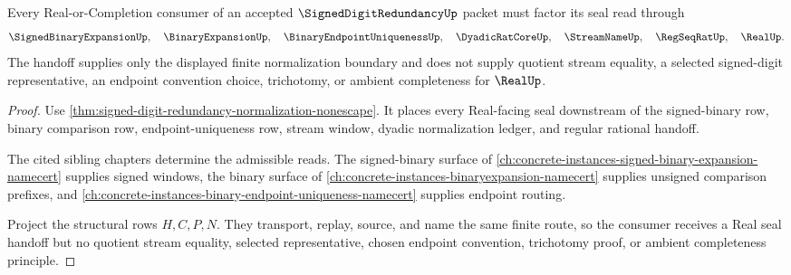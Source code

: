 \begin{theorem}
\label{thm:signed-digit-redundancy-real-seal-handoff}
Every Real-or-Completion consumer of an accepted $\SignedDigitRedundancyUp$ packet must factor its seal read through
$$
\SignedBinaryExpansionUp,\quad \BinaryExpansionUp,\quad \BinaryEndpointUniquenessUp,\quad \DyadicRatCoreUp,\quad \StreamNameUp,\quad \RegSeqRatUp,\quad \RealUp .
$$
The handoff supplies only the displayed finite normalization boundary and does not supply quotient stream equality, a selected signed-digit representative, an endpoint convention choice, trichotomy, or ambient completeness for $\RealUp$.
\end{theorem}
\begin{proof}
Use \autoref{thm:signed-digit-redundancy-normalization-nonescape}. It places every Real-facing seal downstream of the signed-binary row, binary comparison row, endpoint-uniqueness row, stream window, dyadic normalization ledger, and regular rational handoff.

The cited sibling chapters determine the admissible reads. The signed-binary surface of \autoref{ch:concrete-instances-signed-binary-expansion-namecert} supplies signed windows, the binary surface of \autoref{ch:concrete-instances-binaryexpansion-namecert} supplies unsigned comparison prefixes, and \autoref{ch:concrete-instances-binary-endpoint-uniqueness-namecert} supplies endpoint routing.

Project the structural rows $H,C,P,N$. They transport, replay, source, and name the same finite route, so the consumer receives a Real seal handoff but no quotient stream equality, selected representative, chosen endpoint convention, trichotomy proof, or ambient completeness principle.
\end{proof}



